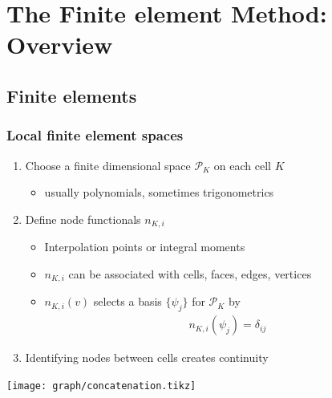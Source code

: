 \section[FEM]{The Finite element Method: Overview}

\lstset{language=bash,
  basicstyle=\ttfamily,
  keywordstyle=\ttfamily,
  showtabs=true,
  tabsize=3,
  tab=\hrulefill}
\subsection{Finite elements}

\begin{frame}
  \frametitle{Local finite element spaces}
  \begin{enumerate}
  \item Choose a finite dimensional space $\mathcal P_K$ on each cell $K$
    \begin{itemize}
    \item usually polynomials, sometimes trigonometrics
    \end{itemize}
  \item Define node functionals $n_{K,i}$
    \begin{itemize}
    \item Interpolation points or integral moments
    \item $n_{K,i}$ can be associated with cells, faces, edges,
      vertices
    \item $n_{K,i}(v)$ selects a basis $\{\psi_j\}$ for $\mathcal P_K$ by
      \begin{gather*}
        n_{K,i}(\psi_j) = \delta_{ij}
      \end{gather*}
    \end{itemize}
  \item Identifying nodes between cells creates continuity
  \end{enumerate}
  \begin{center}
    \texttt{[image: graph/concatenation.tikz]}
  \end{center}
\end{frame}

